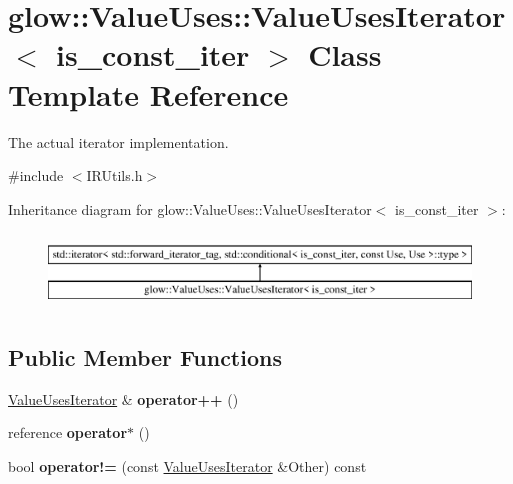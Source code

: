 \hypertarget{classglow_1_1_value_uses_1_1_value_uses_iterator}{}\section{glow\+:\+:Value\+Uses\+:\+:Value\+Uses\+Iterator$<$ is\+\_\+const\+\_\+iter $>$ Class Template Reference}
\label{classglow_1_1_value_uses_1_1_value_uses_iterator}


The actual iterator implementation.  




{\ttfamily \#include $<$I\+R\+Utils.\+h$>$}

Inheritance diagram for glow\+:\+:Value\+Uses\+:\+:Value\+Uses\+Iterator$<$ is\+\_\+const\+\_\+iter $>$\+:\begin{figure}[H]
\begin{center}
\leavevmode
\includegraphics[height=2.000000cm]{classglow_1_1_value_uses_1_1_value_uses_iterator}
\end{center}
\end{figure}
\subsection*{Public Member Functions}
\begin{DoxyCompactItemize}
\item 
\mbox{\label{classglow_1_1_value_uses_1_1_value_uses_iterator_a45c186d63577fe35d8be7bf6d80b55f1}} 
\hyperlink{classglow_1_1_value_uses_1_1_value_uses_iterator}{Value\+Uses\+Iterator} \& {\bfseries operator++} ()
\item 
\mbox{\label{classglow_1_1_value_uses_1_1_value_uses_iterator_a530bdd32d6f837bb1bc13f3a5efdcd79}} 
reference {\bfseries operator$\ast$} ()
\item 
\mbox{\label{classglow_1_1_value_uses_1_1_value_uses_iterator_ab28f4d16246f4efa2cfc44f436dfa083}} 
bool {\bfseries operator!=} (const \hyperlink{classglow_1_1_value_uses_1_1_value_uses_iterator}{Value\+Uses\+Iterator} \&Other) const
\end{DoxyCompactItemize}


